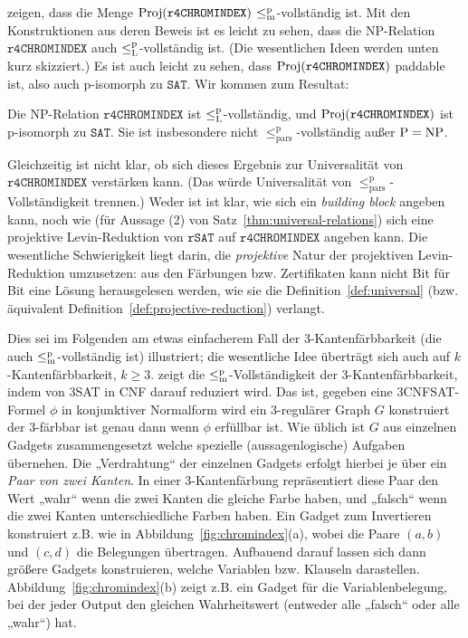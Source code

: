 \textcite{leven_np_1983} zeigen, dass die Menge $\operatorname{Proj}(\mathtt{r4CHROMINDEX})$ $\leq_\mathrm{m}^\mathrm{p}$-vollständig ist. 
Mit den Konstruktionen aus deren Beweis ist es leicht zu sehen, dass die NP-Relation $\mathtt{r4CHROMINDEX}$ auch $\leq_\mathrm{L}^\mathrm{p}$-vollständig ist. (Die wesentlichen Ideen werden unten kurz skizziert.)
Es ist auch leicht zu sehen, dass $\operatorname{Proj}(\mathtt{r4CHROMINDEX})$ paddable ist, also  auch p-isomorph zu $\mathtt{SAT}$.
Wir kommen zum Resultat:
\begin{observation}
    Die NP-Relation $\mathtt{r4CHROMINDEX}$ ist $\leq_\mathrm{L}^\mathrm{p}$-vollständig, und $\operatorname{Proj}(\mathtt{r4CHROMINDEX})$ ist p-isomorph zu $\mathtt{SAT}$.
    Sie ist insbesondere nicht $\leq_\mathrm{pars}^\mathrm p$-vollständig außer $\mathrm{P}=\mathrm{NP}$.
\end{observation}

Gleichzeitig ist nicht klar, ob sich dieses Ergebnis zur Universalität von $\mathtt{r4CHROMINDEX}$ verstärken kann. (Das würde Universalität von $\leq_\mathrm{pars}^\mathrm p$-Vollständigkeit trennen.) Weder ist ist klar, wie sich ein \emph{building block} angeben kann, noch wie (für Aussage (2) von Satz~\ref{thm:universal-relations}) sich eine projektive Levin-Reduktion von $\mathtt{rSAT}$ auf $\mathtt{r4CHROMINDEX}$ angeben kann. Die wesentliche Schwierigkeit liegt darin, die \emph{projektive} Natur der projektiven Levin-Reduktion umzusetzen: aus den Färbungen bzw. Zertifikaten kann nicht Bit für Bit eine Lösung herausgelesen werden, wie sie die Definition~\ref{def:universal} (bzw. äquivalent Definition~\ref{def:projective-reduction}) verlangt.

Dies sei im Folgenden am etwas einfacherem Fall der 3-Kantenfärbbarkeit (die auch $\leq_\mathrm{m}^\mathrm{p}$-vollständig ist) illustriert; die wesentliche Idee überträgt sich auch auf $k$-Kantenfärbbarkeit, $k\geq 3$.
\textcite{holyer_np-completeness_1981} zeigt die $\leq_\mathrm{m}^\mathrm{p}$-Vollständigkeit der 3-Kantenfärbbarkeit, indem von 3SAT in CNF darauf reduziert wird. Das ist, gegeben eine 3CNFSAT-Formel $\phi$ in konjunktiver Normalform wird ein 3-regulärer Graph $G$ konstruiert der 3-färbbar ist genau dann wenn $\phi$ erfüllbar ist. Wie üblich ist $G$ aus einzelnen Gadgets zusammengesetzt welche spezielle (aussagenlogische) Aufgaben übernehen. 
Die „Verdrahtung“ der einzelnen Gadgets erfolgt hierbei je über ein \emph{Paar von zwei Kanten}. In einer 3-Kantenfärbung repräsentiert diese Paar den Wert „wahr“ wenn die zwei Kanten die gleiche Farbe haben, und „falsch“ wenn die zwei Kanten unterschiedliche Farben haben.
Ein Gadget zum Invertieren konstruiert \citeauthor{holyer_np-completeness_1981} z.B. wie in Abbildung~\ref{fig:chromindex}(a), wobei die Paare $(a,b)$ und $(c,d)$ die Belegungen übertragen.
Aufbauend darauf lassen sich dann größere Gadgets konstruieren, welche Variablen bzw. Klauseln darastellen. Abbildung~\ref{fig:chromindex}(b) zeigt z.B. ein Gadget für die Variablenbelegung, bei der jeder Output den gleichen Wahrheitswert (entweder alle „falsch“ oder alle „wahr“) hat.

